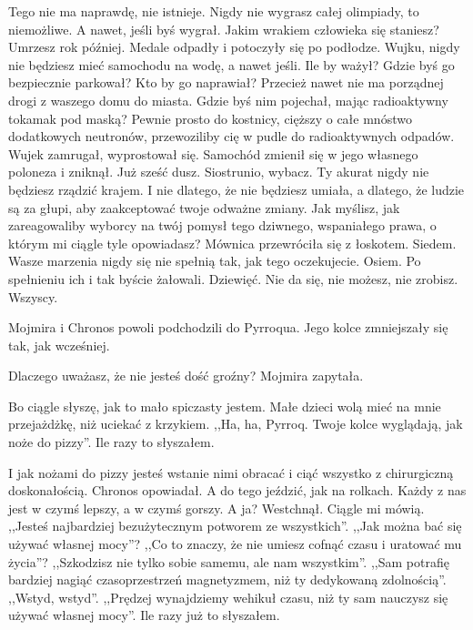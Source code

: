 \ds{}
Tego nie ma naprawdę, nie istnieje.
Nigdy nie wygrasz całej olimpiady, to niemożliwe.
A nawet, jeśli byś wygrał. Jakim wrakiem człowieka się staniesz?
Umrzesz rok później.
\dm{} Medale odpadły i potoczyły się po podłodze. \dm{}
Wujku, nigdy nie będziesz mieć samochodu na wodę, a nawet jeśli.
Ile by ważył? Gdzie byś go bezpiecznie parkował? Kto by go naprawiał?
Przecież nawet nie ma porządnej drogi z waszego domu do miasta.
Gdzie byś nim pojechał, mając radioaktywny tokamak pod maską?
Pewnie prosto do kostnicy, cięższy o całe mnóstwo dodatkowych neutronów, przewoziliby cię w pudle do radioaktywnych odpadów.
\dm{} Wujek zamrugał, wyprostował się. Samochód zmienił się w jego własnego poloneza i zniknął. Już sześć dusz. \dm{}
Siostrunio, wybacz. Ty akurat nigdy nie będziesz rządzić krajem. I nie dlatego, że nie będziesz umiała, a dlatego, że ludzie są za głupi, aby zaakceptować 
twoje odważne zmiany. Jak myślisz, jak zareagowaliby wyborcy na twój pomysł tego dziwnego, wspaniałego prawa, o którym mi ciągle tyle opowiadasz?
\dm{} Mównica przewróciła się z łoskotem. Siedem. \dm{}
Wasze marzenia nigdy się nie spełnią tak, jak tego oczekujecie. \dm{} Osiem. \dm{}
Po spełnieniu ich i tak byście żałowali. \dm{} Dziewięć. \dm{}
Nie da się, nie możesz, nie zrobisz. \dm{} Wszyscy. \dm{}

Mojmira i Chronos powoli podchodzili do Pyrroqua. Jego kolce zmniejszały się tak, jak wcześniej.

\ds{} Dlaczego uważasz, że nie jesteś dość groźny? \dm{} Mojmira zapytała. \de{}

\ds{} Bo ciągle słyszę, jak to mało spiczasty jestem. Małe dzieci wolą mieć na mnie przejażdżkę, niż uciekać z krzykiem.
,,Ha, ha, Pyrroq. Twoje kolce wyglądają, jak noże do pizzy''. Ile razy to słyszałem. \de{}

\ds{} I jak nożami do pizzy jesteś wstanie nimi obracać i ciąć wszystko z chirurgiczną doskonałością. \dm{} Chronos opowiadał. \dm{} A do tego jeździć, jak na rolkach.
Każdy z nas jest w czymś lepszy, a w czymś gorszy. A ja? \dm{} Westchnął. \dm{} Ciągle mi mówią. ,,Jesteś najbardziej bezużytecznym potworem ze wszystkich''. 
,,Jak można bać się używać własnej mocy''? ,,Co to znaczy, że nie umiesz cofnąć czasu i uratować mu życia''?
,,Szkodzisz nie tylko sobie samemu, ale nam wszystkim''.
,,Sam potrafię bardziej nagiąć czasoprzestrzeń magnetyzmem, niż ty dedykowaną zdolnością''.
,,Wstyd, wstyd''. ,,Prędzej wynajdziemy wehikuł czasu, niż ty sam nauczysz się używać własnej mocy''. Ile razy już to słyszałem. \de{}

